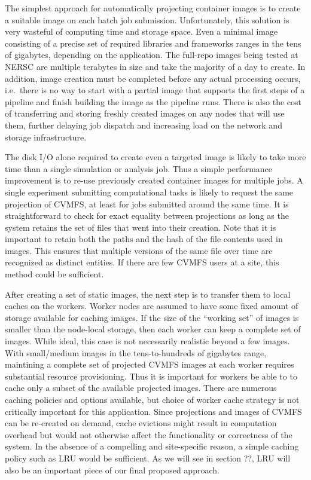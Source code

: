 \documentclass[sigconf]{acmart}
\begin{document}
The simplest approach for automatically projecting container images is to create a suitable image on each batch job submission.
Unfortunately, this solution is very wasteful of computing time and storage space.
Even a minimal image consisting of a precise set of required libraries and frameworks ranges in the tens of gigabytes,
depending on the application.
The full-repo images being tested at NERSC are multiple terabytes in size and take the majority of a day to create.
In addition, image creation must be completed before any actual processing occurs,
i.e.\ there is no way to start with a partial image that supports the first steps of a pipeline and finish building the image as the pipeline runs.
There is also the cost of transferring and storing freshly created images on any nodes that will use them,
further delaying job dispatch and increasing load on the network and storage infrastructure.

The disk I/O alone required to create even a targeted image is likely to take more time than a single simulation or analysis job.
Thus a simple performance improvement is to re-use previously created container images for multiple jobs.
A single experiment submitting computational tasks is likely to request the same projection of CVMFS,
at least for jobs submitted around the same time.
It is straightforward to check for exact equality between projections as long as the system retains the set of files that went into their creation.
Note that it is important to retain both the paths and the hash of the file contents used in images.
This ensures that multiple versions of the same file over time are recognized as distinct entities.
If there are few CVMFS users at a site,
this method could be sufficient.

After creating a set of static images,
the next step is to transfer them to local caches on the workers.
Worker nodes are assumed to have some fixed amount of storage available for caching images.
If the size of the ``working set'' of images is smaller than the node-local storage,
then each worker can keep a complete set of images.
While ideal, this case is not necessarily realistic beyond a few images.
With small/medium images in the tens-to-hundreds of gigabytes range,
maintining a complete set of projected CVMFS images at each worker requires substantial resource provisioning.
Thus it is important for workers be able to to cache only a subset of the available projected images.
There are numerous caching policies and options available,
but choice of worker cache strategy is not critically important for this application.
Since projections and images of CVMFS can be re-created on demand,
cache evictions might result in computation overhead but would not otherwise affect the functionality or correctness of the system.
In the absence of a compelling and site-specific reason,
a simple caching policy such as LRU would be sufficient.
As we will see in section ??,
LRU will also be an important piece of our final proposed approach.
\end{document}
